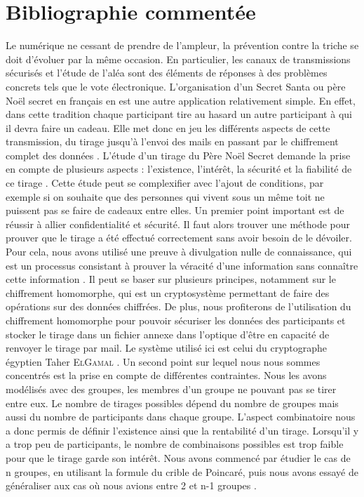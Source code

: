 \documentclass[a4paper, 12pt]{report}
\begin{document}
    \section{Bibliographie commentée}
        Le numérique ne cessant de prendre de l’ampleur, la prévention contre la triche se doit d’évoluer par la même occasion. En particulier, les canaux de transmissions sécurisés et l’étude de l'aléa sont des éléments de réponses à des problèmes concrets tels que le vote électronique. L’organisation d’un Secret Santa ou père Noël secret en français en est une autre application relativement simple. En effet, dans cette tradition chaque participant tire au hasard un autre participant à qui il devra faire un cadeau. Elle met donc en jeu les différents aspects de cette transmission, du tirage jusqu’à l’envoi des mails en passant par le chiffrement complet des données \cite{bib:1}.
        \bigbreak
        L’étude d’un tirage du Père Noël Secret demande la prise en compte de plusieurs aspects : l’existence, l’intérêt, la sécurité et la fiabilité de ce tirage \cite{bib:2}. Cette étude peut se complexifier avec l’ajout de conditions, par exemple si on souhaite que des personnes qui vivent sous un même toit ne puissent pas se faire de cadeaux entre elles.
        \bigbreak
        Un premier point important est de réussir à allier confidentialité et sécurité. Il faut alors trouver une méthode pour prouver que le tirage a été effectué correctement sans avoir besoin de le dévoiler. Pour cela, nous avons utilisé une \og preuve à divulgation nulle de connaissance\fg{}, qui est un processus consistant à prouver la véracité d’une information sans connaître cette information \cite{bib:3}. Il peut se baser sur plusieurs principes, notamment sur le chiffrement homomorphe, qui est un cryptosystème permettant de faire des opérations sur des données chiffrées. De plus, nous profiterons de l’utilisation du chiffrement homomorphe pour pouvoir sécuriser les données des participants et stocker le tirage dans un fichier annexe dans l’optique d’être en capacité de renvoyer le tirage par mail. Le système utilisé ici est celui du cryptographe égyptien Taher \textsc{ElGamal} \cite{bib:4}.
        \bigbreak
        Un second point sur lequel nous nous sommes concentrés est la prise en compte de différentes contraintes. Nous les avons modélisés avec des groupes, les membres d’un groupe ne pouvant pas se tirer entre eux. Le nombre de tirages possibles dépend du nombre de groupes mais aussi du nombre de participants dans chaque groupe. L’aspect combinatoire nous a donc permis de définir l’existence ainsi que la rentabilité d’un tirage. Lorsqu’il y a trop peu de participants, le nombre de combinaisons possibles est trop faible pour que le tirage garde son intérêt. Nous avons commencé par étudier le cas de n groupes, en utilisant la formule du crible de Poincaré, puis nous avons essayé de généraliser aux cas où nous avions entre 2 et n-1 groupes \cite{bib:5, bib:6}.
\end{document}
